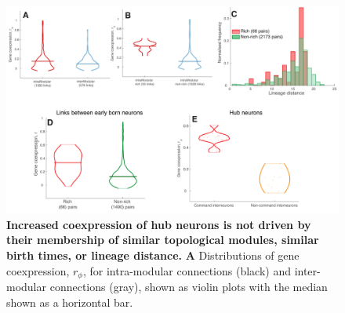 \documentclass[10pt,letterpaper]{article}
\begin{document}

\begin{figure}[!h]
\centering
    \includegraphics[width=1\textwidth]{extrasALL.pdf}
 \caption{
 \textbf{Increased coexpression of hub neurons is not driven by their membership of similar topological modules, similar birth times, or lineage distance.}
\textbf{A} Distributions of gene coexpression, $r_\phi$, for intra-modular connections (black) and inter-modular connections (gray), shown as violin plots with the median shown as a horizontal bar.
}
\end{figure}
\end{document}
